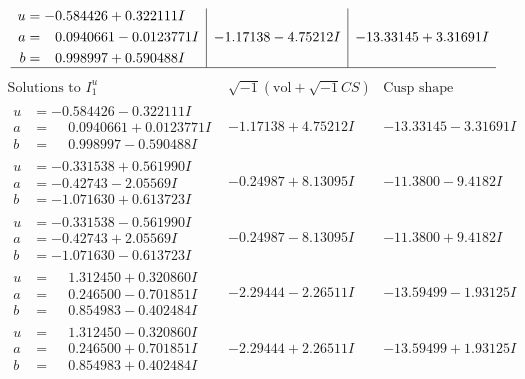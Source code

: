 \documentclass[1p]{elsarticle_modified}
\theoremstyle{definition}
\newcommand{\I}{\sqrt{-1}}
\begin{document}
$$\begin{array}{c|c|c}
\begin{aligned}
u &= -0.584426 + 0.322111 I \\
a &= \phantom{-}0.0940661 - 0.0123771 I \\
b &= \phantom{-}0.998997 + 0.590488 I\end{aligned}
 & -1.17138 - 4.75212 I & -13.33145 + 3.31691 I\\
 \hline 
 \end{array}$$\newpage$$\begin{array}{c|c|c}  
\text{Solutions to }I^u_{1}& \I (\text{vol} + \sqrt{-1}CS) & \text{Cusp shape}\\
 \hline 
\begin{aligned}
u &= -0.584426 - 0.322111 I \\
a &= \phantom{-}0.0940661 + 0.0123771 I \\
b &= \phantom{-}0.998997 - 0.590488 I\end{aligned}
 & -1.17138 + 4.75212 I & -13.33145 - 3.31691 I \\ \hline\begin{aligned}
u &= -0.331538 + 0.561990 I \\
a &= -0.42743 - 2.05569 I \\
b &= -1.071630 + 0.613723 I\end{aligned}
 & -0.24987 + 8.13095 I & -11.3800 - 9.4182 I \\ \hline\begin{aligned}
u &= -0.331538 - 0.561990 I \\
a &= -0.42743 + 2.05569 I \\
b &= -1.071630 - 0.613723 I\end{aligned}
 & -0.24987 - 8.13095 I & -11.3800 + 9.4182 I \\ \hline\begin{aligned}
u &= \phantom{-}1.312450 + 0.320860 I \\
a &= \phantom{-}0.246500 - 0.701851 I \\
b &= \phantom{-}0.854983 - 0.402484 I\end{aligned}
 & -2.29444 - 2.26511 I & -13.59499 - 1.93125 I \\ \hline\begin{aligned}
u &= \phantom{-}1.312450 - 0.320860 I \\
a &= \phantom{-}0.246500 + 0.701851 I \\
b &= \phantom{-}0.854983 + 0.402484 I\end{aligned}
 & -2.29444 + 2.26511 I & -13.59499 + 1.93125 I \\ \hline\begin{aligned}

\end{aligned}
\end{array}$$
\end{document}
